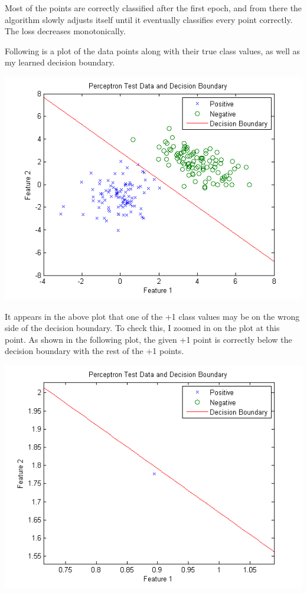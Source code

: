 \documentclass{article}
\begin{document}
Most of the points are correctly classified after the first epoch, and from there the algorithm slowly adjusts itself until it eventually classifies every point correctly. The loss decreases monotonically.

Following is a plot of the data points along with their true class values, as well as my learned decision boundary.

\includegraphics[scale=0.75]{perceptron.png}

It appears in the above plot that one of the +1 class values may be on the wrong side of the decision boundary. To check this, I zoomed in on the plot at this point. As shown in the following plot, the given +1 point is correctly below the decision boundary with the rest of the +1 points.

\includegraphics[scale=0.75]{perceptron_zoom.png}
\end{document}
